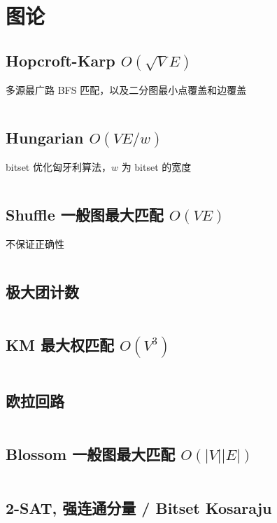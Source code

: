 \section{图论}
				\subsection{Hopcroft-Karp $O(\sqrt{V} E)$}
					多源最广路 BFS 匹配，以及二分图最小点覆盖和边覆盖
					\inputminted[highlightlines={5,9}]{cpp}{sections/GraphTheory/assets/graph/hk_skip2004.cpp}
				\subsection{Hungarian $O(V E / w)$}
					bitset 优化匈牙利算法，$w$ 为 bitset 的宽度
					\inputminted{cpp}{sections/GraphTheory/assets/graph/Hungarian.cpp}
				\subsection{Shuffle 一般图最大匹配 $O(V E)$}
					不保证正确性
					\inputminted{cpp}{sections/GraphTheory/assets/graph/一般图最大匹配-shuffle.cpp}
				\subsection{极大团计数}
					\inputminted{cpp}{sections/GraphTheory/assets/graph/CliqueCount.cpp}
				\subsection{KM 最大权匹配 $O(V^3)$}
					\inputminted{cpp}{sections/GraphTheory/assets/graph/KM.cpp}
				\subsection{欧拉回路}
					\inputminted{cpp}{sections/GraphTheory/assets/graph/欧拉回路.cpp}
				\subsection{Blossom 一般图最大匹配 $O(|V||E|)$}
					\inputminted{cpp}{sections/GraphTheory/assets/graph/Blossom_Tree.cpp}
				\subsection{2-SAT, 强连通分量 / Bitset Kosaraju}
					\inputminted{cpp}{sections/GraphTheory/assets/graph/2-sat.cpp}
					\inputminted{cpp}{sections/GraphTheory/assets/graph/kosaraju.cpp}
